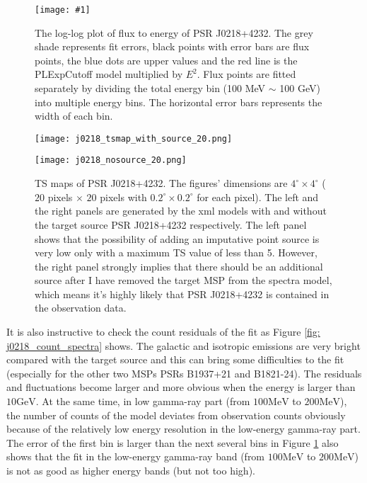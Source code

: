 \documentclass[12pt]{report}
\newcommand{\singleFig}[3]{
  \begin{figure}[!htp]
    \centering
    \texttt{[image: \#1]}
    \caption{#3}
    \label{fig: #1}
  \end{figure}
}
\begin{document}
      \singleFig{j0218_cur.png}{0.35}{The log-log plot of flux to energy of PSR J0218+4232. The grey shade represents 
        fit errors, black points with error bars are flux points, the blue dots are upper values and the 
        red line is the PLExpCutoff model multiplied by $E^2$. Flux points 
        are fitted separately by dividing the total energy bin (100 MeV $\sim$ 100 GeV) into multiple energy bins.
        The horizontal error bars represents the width of each bin. }
      \vspace{1cm}
      \begin{figure}[!htp]
        \begin{center}
        \begin{minipage}{0.46\textwidth}
          \begin{center} 
            \texttt{[image: j0218\_tsmap\_with\_source\_20.png]}
          \end{center}
        \end{minipage}
        \begin{minipage}{0.45\textwidth}
          \begin{center}
            \texttt{[image: j0218\_nosource\_20.png]}
          \end{center}
        \end{minipage}
      \end{center}
      \caption{TS maps of PSR J0218+4232. The figures' dimensions are 
        $4^{\circ} \times 4^{\circ}$ ($20$ pixels $\times$ $20$ pixels with 
        $0.2^{\circ} \times 0.2^{\circ}$ for each pixel). The left and the right panels are 
        generated by the xml models with and without the target source PSR J0218+4232 respectively.
        The left panel shows that the possibility of adding an imputative point source is very low 
        only with a maximum TS value of less than 5. However, the right panel strongly implies that 
        there should be an additional source after I have removed the target MSP from the spectra 
        model, which means it's highly likely that PSR J0218+4232 is contained in the observation 
        data.}
      \label{fig: j0218_tsmap_comparison_20}
      \end{figure}

      It is also instructive to check the count residuals of the fit as Figure 
      \ref{fig: j0218_count_spectra} shows. The galactic and isotropic emissions are very 
      bright compared with the target source and this can bring some difficulties to 
      the fit (especially for the other two MSPs PSRs B1937+21 and B1821-24). The residuals 
      and fluctuations become larger and more obvious when the energy is larger than 
      $10\mbox{GeV}$. At the same time, in low gamma-ray part 
      (from $100\mbox{MeV}$ to $200\mbox{MeV}$), the number of counts of the model 
      deviates from observation counts obviously because of the relatively low energy 
      resolution in the low-energy gamma-ray part. The error of the first bin is larger
      than the next several bins in Figure \ref{fig: j0218_cur.png} also shows that 
      the fit in the low-energy gamma-ray band (from $100\mbox{MeV}$ to $200\mbox{MeV}$) 
      is not as good as higher energy bands (but not too high). 
            
\end{document}
